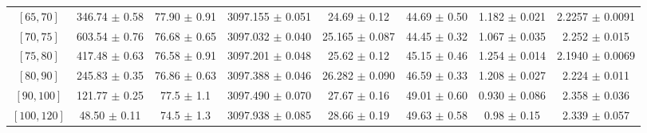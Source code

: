 \begin{tabular}{c||c|c|c|c|c|c|c}
$[65, 70]$ & 346.74 $\pm$ 0.58 & 77.90 $\pm$ 0.91 & 3097.155 $\pm$ 0.051 & 24.69 $\pm$ 0.12 & 44.69 $\pm$ 0.50 & 1.182 $\pm$ 0.021 & 2.2257 $\pm$ 0.0091\\
$[70, 75]$ & 603.54 $\pm$ 0.76 & 76.68 $\pm$ 0.65 & 3097.032 $\pm$ 0.040 & 25.165 $\pm$ 0.087 & 44.45 $\pm$ 0.32 & 1.067 $\pm$ 0.035 & 2.252 $\pm$ 0.015\\
$[75, 80]$ & 417.48 $\pm$ 0.63 & 76.58 $\pm$ 0.91 & 3097.201 $\pm$ 0.048 & 25.62 $\pm$ 0.12 & 45.15 $\pm$ 0.46 & 1.254 $\pm$ 0.014 & 2.1940 $\pm$ 0.0069\\
$[80, 90]$ & 245.83 $\pm$ 0.35 & 76.86 $\pm$ 0.63 & 3097.388 $\pm$ 0.046 & 26.282 $\pm$ 0.090 & 46.59 $\pm$ 0.33 & 1.208 $\pm$ 0.027 & 2.224 $\pm$ 0.011\\
$[90, 100]$ & 121.77 $\pm$ 0.25 & 77.5 $\pm$ 1.1 & 3097.490 $\pm$ 0.070 & 27.67 $\pm$ 0.16 & 49.01 $\pm$ 0.60 & 0.930 $\pm$ 0.086 & 2.358 $\pm$ 0.036\\
$[100, 120]$ & 48.50 $\pm$ 0.11 & 74.5 $\pm$ 1.3 & 3097.938 $\pm$ 0.085 & 28.66 $\pm$ 0.19 & 49.63 $\pm$ 0.58 & 0.98 $\pm$ 0.15 & 2.339 $\pm$ 0.057\\
\end{tabular}
